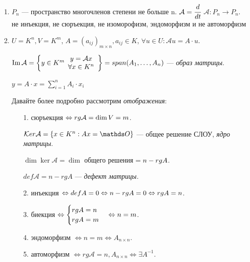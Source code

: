 \begin{enumerate}
    \item $P_n$ --- пространство многочленов степени не больше n. $\mathcal{A}= \cfrac{d}{dt} $ $\mathcal{A}:P_n \rightarrow P_n$. не инъекция, не сюръекция, не изоморофизм, эндоморфизм и не автоморфизм
    \item $U = K^n, V = K^m$, $A = (a_{ij})_{m\times n}, a_{ij} \in K$,  $\forall u \in U   :\mathcal{A}u=A\cdot u$.

    $\operatorname{Im} \mathcal{A} = \left\{y\in K^m \begin{array}{cc}
         y = \mathcal{A}x \\
          \forall x \in K^n
    \end{array}\right\} = span (A_1,\ldots,A_n)$ --- \emph{образ матрицы}.

    $y = A\cdot x = \sum\limits_{i=1}^nA_i\cdot x_i$

    Давайте более подробно рассмотрим \emph{отображения}:

    \begin{itemize}
        \item[1.] сюръекция $\Leftrightarrow rg \mathcal{A} = \dim V  = m$.

        $\ker \mathcal{A} = \{x \in K^n: Ax = \zero\}$ --- общее решение СЛОУ, 
        \emph{ядро матрицы}.

        $\dim \ker \mathcal{A} = \dim $ общего решения $= n - rg A$.

            $def \mathcal{A} = n - rg A$ --- \emph{дефект матрицы.}

        \item[2.] инъекция $\Leftrightarrow def A=0 \Leftrightarrow n-rg A = 0 \Leftrightarrow rg A = n$.

        \item[3.] биекция $\Leftrightarrow \begin{cases}
            rg A = n \\
            rg A = m
        \end{cases} \Leftrightarrow n = m$.

        \item[4.] эндоморфизм $\Leftrightarrow n = m \Leftrightarrow A_{n \times n}$.

        \item[5.] автоморфизм $\Leftrightarrow rg \mathcal{A} = n, A_{n\times n }\Leftrightarrow \exists A^{-1}$.
    \end{itemize}
    
   
\end{enumerate}


